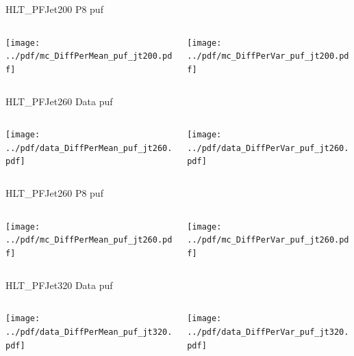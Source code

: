 \documentclass[9pt]{beamer}
\begin{document}
\begin{frame}[t]{HLT\_PFJet200 P8 puf}
\begin{columns}[T]
  \begin{column}{.5\textwidth}
  \texttt{[image: ../pdf/mc\_DiffPerMean\_puf\_jt200.pdf]}
  \end{column}
  \begin{column}{.5\textwidth}
  \texttt{[image: ../pdf/mc\_DiffPerVar\_puf\_jt200.pdf]}
  \end{column}
\end{columns}
\end{frame}

\begin{frame}[t]{HLT\_PFJet260 Data puf}
\begin{columns}[T]
  \begin{column}{.5\textwidth}
  \texttt{[image: ../pdf/data\_DiffPerMean\_puf\_jt260.pdf]}
  \end{column}
  \begin{column}{.5\textwidth}
  \texttt{[image: ../pdf/data\_DiffPerVar\_puf\_jt260.pdf]}
  \end{column}
\end{columns}
\end{frame}

\begin{frame}[t]{HLT\_PFJet260 P8 puf}
\begin{columns}[T]
  \begin{column}{.5\textwidth}
  \texttt{[image: ../pdf/mc\_DiffPerMean\_puf\_jt260.pdf]}
  \end{column}
  \begin{column}{.5\textwidth}
  \texttt{[image: ../pdf/mc\_DiffPerVar\_puf\_jt260.pdf]}
  \end{column}
\end{columns}
\end{frame}

\begin{frame}[t]{HLT\_PFJet320 Data puf}
\begin{columns}[T]
  \begin{column}{.5\textwidth}
  \texttt{[image: ../pdf/data\_DiffPerMean\_puf\_jt320.pdf]}
  \end{column}
  \begin{column}{.5\textwidth}
  \texttt{[image: ../pdf/data\_DiffPerVar\_puf\_jt320.pdf]}
  \end{column}
\end{columns}
\end{frame}
\end{document}

